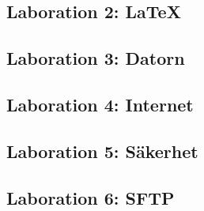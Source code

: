 \documentclass[a4paper,11pt,logo]{miunart}
\begin{document}
\subsection*{Laboration 2: \LaTeX}
\noindent



\subsection*{Laboration 3: Datorn}
\noindent



\subsection*{Laboration 4: Internet}
\noindent



\subsection*{Laboration 5: Säkerhet}
\noindent



\subsection*{Laboration 6: SFTP}
\noindent




\end{document}
